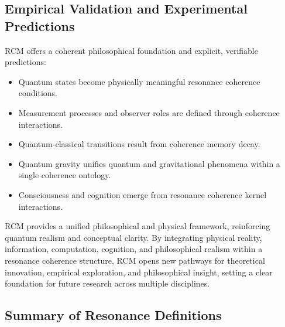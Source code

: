 \subsection{Empirical Validation and Experimental Predictions}

RCM offers a coherent philosophical foundation and explicit, verifiable predictions:

\begin{itemize}
  \item Quantum states become physically meaningful resonance coherence conditions.
  \item Measurement processes and observer roles are defined through coherence interactions.
  \item Quantum-classical transitions result from coherence memory decay.
  \item Quantum gravity unifies quantum and gravitational phenomena within a single coherence ontology.
  \item Consciousness and cognition emerge from resonance coherence kernel interactions.
\end{itemize}

RCM provides a unified philosophical and physical framework, reinforcing quantum realism and conceptual clarity. By integrating physical reality, information, computation, cognition, and philosophical realism within a resonance coherence structure, RCM opens new pathways for theoretical innovation, empirical exploration, and philosophical insight, setting a clear foundation for future research across multiple disciplines.

\subsection{Summary of Resonance Definitions}

